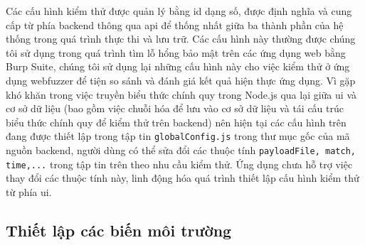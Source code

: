 Các cấu hình kiểm thử được quản lý bằng id dạng số, được định nghĩa và cung cấp từ phía backend thông qua \acrshort{api} để thống nhất giữa ba thành phần của hệ thống trong quá trình thực thi và lưu trữ. Các cấu hình này thường được chúng tôi sử dụng trong quá trình tìm lỗ hổng bảo mật trên các ứng dụng web bằng Burp Suite, chúng tôi sử dụng lại những cấu hình này cho việc kiểm thử ở ứng dụng webfuzzer để tiện so sánh và đánh giá kết quả hiện thực ứng dụng. Vì gặp khó khăn trong việc truyền biểu thức chính quy trong Node.js qua lại giữa \acrshort{ui} và cơ sở dữ liệu (bao gồm việc chuỗi hóa để lưu vào cơ sở dữ liệu và tái cấu trúc biểu thức chính quy để kiểm thử trên backend) nên hiện tại các cấu hình trên đang được thiết lập trong tập tin \texttt{globalConfig.js} trong thư mục gốc của mã nguồn backend, người dùng có thể sửa đổi các thuộc tính \texttt{payloadFile, match, time,...} trong tập tin trên theo nhu cầu kiểm thử. Ứng dụng chưa hỗ trợ việc thay đổi các thuộc tính này, linh động hóa quá trình thiết lập cấu hình kiểm thử từ phía \acrshort{ui}.\par
\subsection{Thiết lập các biến môi trường}

